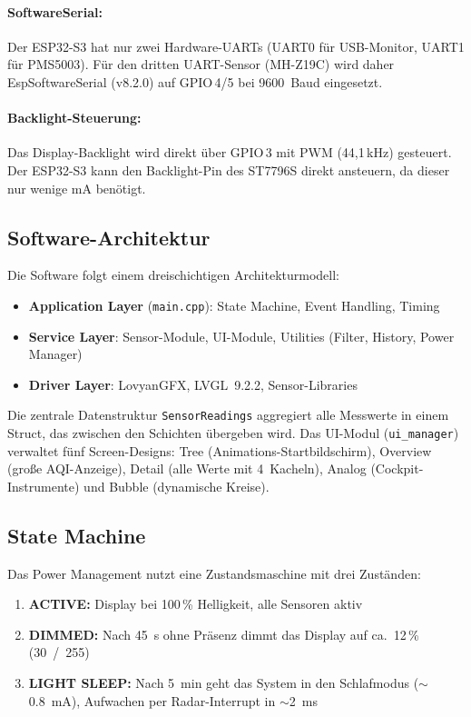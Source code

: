 \paragraph{SoftwareSerial:} Der ESP32-S3 hat nur zwei Hardware-UARTs (UART0 für USB-Monitor, UART1 für PMS5003). Für den dritten UART-Sensor (MH-Z19C) wird daher EspSoftwareSerial (v8.2.0) auf GPIO\,4/5 bei \SI{9600}{Baud} eingesetzt.

\paragraph{Backlight-Steuerung:} Das Display-Backlight wird direkt über GPIO\,3 mit PWM (44,1\,kHz) gesteuert. Der ESP32-S3 kann den Backlight-Pin des ST7796S direkt ansteuern, da dieser nur wenige mA benötigt.

\subsection{Software-Architektur}
\label{sec:sw_arch}

Die Software folgt einem dreischichtigen Architekturmodell:

\begin{itemize}[nosep]
\item \textbf{Application Layer} (\texttt{main.cpp}): State Machine, Event Handling, Timing
\item \textbf{Service Layer}: Sensor-Module, UI-Module, Utilities (Filter, History, Power Manager)
\item \textbf{Driver Layer}: LovyanGFX, LVGL~9.2.2, Sensor-Libraries
\end{itemize}

Die zentrale Datenstruktur \texttt{SensorReadings} aggregiert alle Messwerte in einem Struct, das zwischen den Schichten übergeben wird. Das UI-Modul (\texttt{ui\_manager}) verwaltet fünf Screen-Designs: Tree (Animations-Startbildschirm), Overview (große AQI-Anzeige), Detail (alle Werte mit 4~Kacheln), Analog (Cockpit-Instrumente) und Bubble (dynamische Kreise).

\subsection{State Machine}
\label{sec:statemachine}

Das Power Management nutzt eine Zustandsmaschine mit drei Zuständen:

\begin{enumerate}[nosep]
\item \textbf{ACTIVE:} Display bei 100\,\% Helligkeit, alle Sensoren aktiv
\item \textbf{DIMMED:} Nach \SI{45}{\second} ohne Präsenz dimmt das Display auf ca.\ 12\,\% (\SI{30}{/255})
\item \textbf{LIGHT SLEEP:} Nach \SI{5}{\minute} geht das System in den Schlafmodus (${\sim}$\SI{0,8}{\milli\ampere}), Aufwachen per Radar-Interrupt in ${\sim}$\SI{2}{\milli\second}
\end{enumerate}

